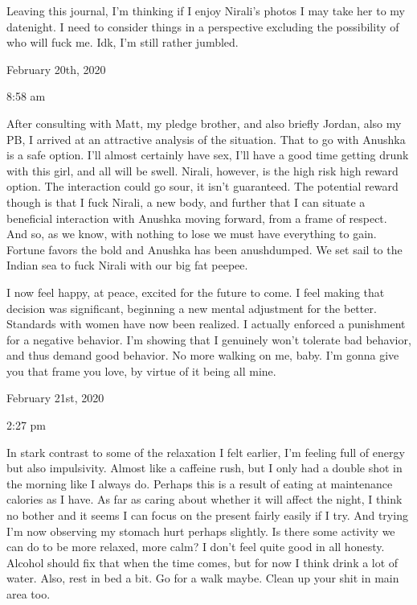\qquad Leaving this journal, I'm thinking if I enjoy Nirali's photos I
may take her to my datenight. I need to consider things in a perspective
excluding the possibility of who will fuck me. Idk, I'm still rather
jumbled.

\bigskip
\bigskip
February 20th, 2020

8:58 am

After consulting with Matt, my pledge brother, and also briefly Jordan,
also my PB, I arrived at an attractive analysis of the situation. That
to go with Anushka is a safe option. I'll almost certainly have sex,
I'll have a good time getting drunk with this girl, and all will be
swell. Nirali, however, is the high risk high reward option. The
interaction could go sour, it isn't guaranteed. The potential reward
though is that I fuck Nirali, a new body, and further that I can situate
a beneficial interaction with Anushka moving forward, from a frame of
respect. And so, as we know, with nothing to lose we must have
everything to gain. Fortune favors the bold and Anushka has been
anushdumped. We set sail to the Indian sea to fuck Nirali with our big
fat peepee.

\qquad I now feel happy, at peace, excited for the future to come. I
feel making that decision was significant, beginning a new mental
adjustment for the better. Standards with women have now been realized.
I actually enforced a punishment for a negative behavior. I'm showing
that I genuinely won't tolerate bad behavior, and thus demand good
behavior. No more walking on me, baby. I'm gonna give you that frame you
love, by virtue of it being all mine.

\bigskip
\bigskip
February 21st, 2020

2:27 pm

In stark contrast to some of the relaxation I felt earlier, I'm feeling
full of energy but also impulsivity. Almost like a caffeine rush, but I
only had a double shot in the morning like I always do. Perhaps this is
a result of eating at maintenance calories as I have. As far as caring
about whether it will affect the night, I think no bother and it seems I
can focus on the present fairly easily if I try. And trying I'm now
observing my stomach hurt perhaps slightly. Is there some activity we
can do to be more relaxed, more calm? I don't feel quite good in all
honesty. Alcohol should fix that when the time comes, but for now I
think drink a lot of water. Also, rest in bed a bit. Go for a walk
maybe. Clean up your shit in main area too.

